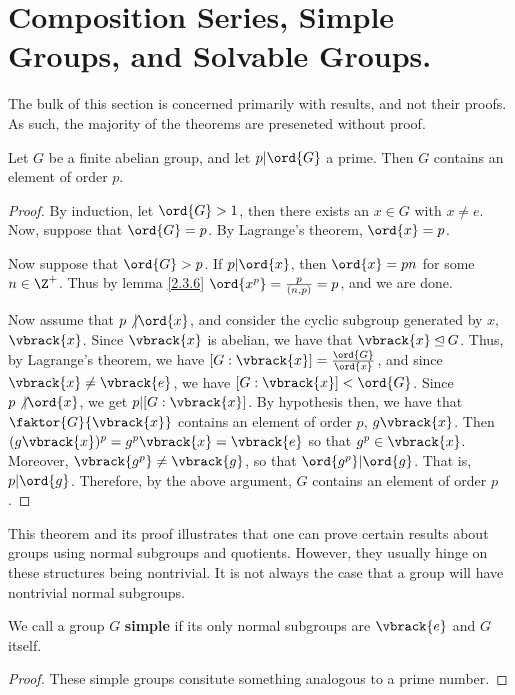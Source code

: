 \section{Composition Series, Simple Groups, and Solvable Groups.}
\label{section1}

The bulk of this section is concerned primarily with results, and not their
proofs. As such, the majority of the theorems are preseneted without proof.

\begin{theorem}\label{3.5.1}
    Let $G$ be a finite abelian group, and let  $p|\ord{G}$ a prime. Then $G$
    contains an element of order  $p$.
\end{theorem}
\begin{proof}
    By induction, let $\ord{G}>1$, then there exists an $x \in G$ with  $x \neq
    e$. Now, suppose that $\ord{G}=p$. By  Lagrange's theorem, $\ord{x}=p$.

    Now suppose that $\ord{G} > p$. If $p|\ord{x}$, then $\ord{x}=pn$ for some
    $n \in \Z^+$. Thus by lemma \ref{2.3.6} $\ord{x^p}=\frac{p}{(n,p)}=p$, and
    we are done.

    Now assume that $p \not| \ord{x}$, and consider the cyclic subgroup
    generated by $x$,  $\vbrack{x}$. Since $\vbrack{x}$ is abelian, we have that
    $\vbrack{x} \unlhd G$. Thus, by Lagrange's theorem, we have $[G :
    \vbrack{x}]=\frac{\ord{G}}{\ord{x}}$, and since $\vbrack{x} \neq
    \vbrack{e}$, we have $[G : \vbrack{x}] < \ord{G}$. Since $p \not| \ord{x}$,
    we get $p|[G : \vbrack{x}]$. By hypothesis then, we have that
    $\faktor{G}{\vbrack{x}}$ contains an element of order $p$,  $g\vbrack{x}$.
    Then $(g\vbrack{x})^p=g^p\vbrack{x}=\vbrack{e}$ so that $g^p \in
    \vbrack{x}$. Moreover, $\vbrack{g^p} \neq \vbrack{g}$, so that
    $\ord{g^p}|\ord{g}$. That is, $p|\ord{g}$. Therefore, by the above argument,
    $G$ contains an element of order  $p$.
\end{proof}
\begin{remark}
    This theorem and its proof illustrates that one can prove certain results
    about groups using normal subgroups and quotients. However, they usually
    hinge on these structures being nontrivial. It is not always the case that a
    group will have nontrivial normal subgroups.
\end{remark}

\begin{definition}
    We call a group $G$ \textbf{simple} if its only normal subgroups are
    $\vbrack{e}$ and $G$ itself.
\end{definition}
\begin{proof}
    These simple groups consitute something analogous to a prime number.
\end{proof}

